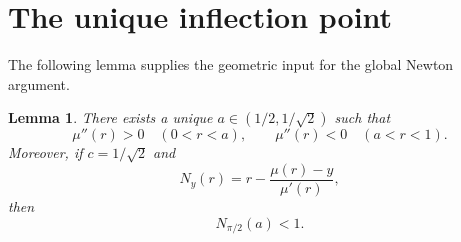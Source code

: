 \documentclass[11pt]{article}
\newtheorem{lemma}[theorem]{Lemma}
\theoremstyle{remark}
\begin{document}
\section{The unique inflection point}

The following lemma supplies the geometric input for the global Newton
argument.

\begin{lemma}\label{lem:inflection}
There exists a unique $a\in(1/2,1/\sqrt2)$ such that
\begin{equation}\label{eq:convex-concave}
 \mu''(r)>0\quad(0<r<a),
 \qquad
 \mu''(r)<0\quad(a<r<1).
\end{equation}
Moreover, if $c=1/\sqrt2$ and
\[
 N_y(r)=r-\frac{\mu(r)-y}{\mu'(r)},
\]
then
\begin{equation}\label{eq:key-barrier}
 N_{\pi/2}(a)<1.
\end{equation}
\end{lemma}
\end{document}
